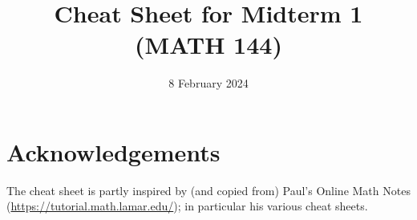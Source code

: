 \documentclass[9pt]{extarticle}
\title{Cheat Sheet for Midterm 1 (MATH 144)}
\date{8 February 2024}
\theoremstyle{definition}
\theoremstyle{remark}
\begin{document}
	
	\pagebreak
	
	\pagebreak
	
	\pagebreak
	

	\section{Acknowledgements}
	The cheat sheet is partly inspired by (and copied from) Paul's Online Math Notes (\url{https://tutorial.math.lamar.edu/}); in particular his various cheat sheets.
\end{document}
